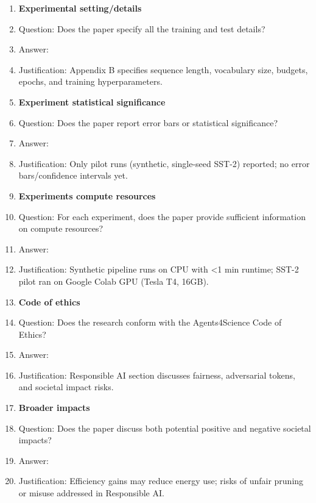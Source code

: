 \documentclass{article}
\begin{document}
\begin{enumerate}
\item {\bf Experimental setting/details}  
\item[] Question: Does the paper specify all the training and test details?  
\item[] Answer: \answerYes{}  
\item[] Justification: Appendix B specifies sequence length, vocabulary size, budgets, epochs, and training hyperparameters.

\item {\bf Experiment statistical significance}  
\item[] Question: Does the paper report error bars or statistical significance?  
\item[] Answer: \answerYes{}  
\item[] Justification: Only pilot runs (synthetic, single-seed SST-2) reported; no error bars/confidence intervals yet.

\item {\bf Experiments compute resources}  
\item[] Question: For each experiment, does the paper provide sufficient information on compute resources?  
\item[] Answer: \answerYes{}  
\item[] Justification: Synthetic pipeline runs on CPU with <1 min runtime; SST-2 pilot ran on Google Colab GPU (Tesla T4, 16GB).

\item {\bf Code of ethics}  
\item[] Question: Does the research conform with the Agents4Science Code of Ethics?  
\item[] Answer: \answerYes{}  
\item[] Justification: Responsible AI section discusses fairness, adversarial tokens, and societal impact risks.

\item {\bf Broader impacts}  
\item[] Question: Does the paper discuss both potential positive and negative societal impacts?  
\item[] Answer: \answerYes{}  
\item[] Justification: Efficiency gains may reduce energy use; risks of unfair pruning or misuse addressed in Responsible AI.
\end{enumerate}
\end{document}

